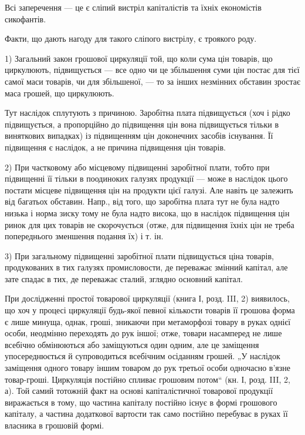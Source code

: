 Всі заперечення — це є сліпий вистріл капіталістів та їхніх економістів
сикофантів.

Факти, що дають нагоду для такого сліпого вистрілу, є троякого роду.

1) Загальний закон грошової циркуляції той, що коли сума цін товарів,
що циркулюють, підвищується — все одно чи це збільшення суми
цін постає для тієї самої маси товарів, чи для збільшеної, — то за інших
незмінних обставин зростає маса грошей, що циркулюють.

Тут наслідок сплутують з причиною. Заробітна плата підвищується (хоч
і рідко підвищується, а пропорційно до підвищення цін вона підвищується
тільки в виняткових випадках) із підвищенням цін доконечних засобів існування.
Її підвищення є наслідок, а не причина підвищення цін товарів.

2) При частковому або місцевому підвищенні заробітної плати, тобто
при підвищенні її тільки в поодиноких галузях продукції — може в наслідок
цього постати місцеве підвищення цін на продукти цієї галузі. Але навіть
це залежить від багатьох обставин. Напр., від того, що заробітна плата
тут не була надто низька і норма зиску тому не була надто висока, що
в наслідок підвищення цін ринок для цих товарів не скорочується
(отже, для підвищення їхніх цін не треба попереднього зменшення
подання їх) і т. ін.

3) При загальному підвищенні заробітної плати підвищується ціна товарів,
продукованих в тих галузях промисловости, де переважає змінний капітал,
але зате спадає в тих, де переважає сталий, зглядно основний капітал.

При дослідженні простої товарової циркуляції (книга І, розд. III, 2) виявилось,
що хоч у процесі циркуляції будь-якої певної кількости товарів її
грошова форма є лише минуща, однак, гроші, зникаючи при метаморфозі
товару в руках однієї особи, неодмінно переходять до рук іншої; отже,
товари насамперед не лише всебічно обмінюються або заміщуються один
одним, але це заміщення упосереднюється й супроводиться всебічним
осіданням грошей. „У наслідок заміщення одного товару іншим товаром
до рук третьої особи одночасно в’язне товар-гроші. Циркуляція постійно
спливає грошовим потом“ (кн. І, розд. III, 2, а). Той самий тотожній
факт на основі капіталістичної товарової продукції виражається в тому,
що частина капіталу постійно існує в формі грошового капіталу, а частина
додаткової вартости так само постійно перебуває в руках її власника
в грошовій формі.

